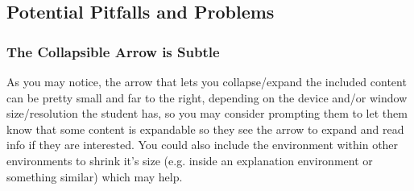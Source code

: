 \documentclass{ximera}
\begin{document}
    \subsection*{Potential Pitfalls and Problems}
    
        \subsubsection*{The Collapsible Arrow is Subtle}
            As you may notice, the arrow that lets you collapse/expand the included content can be pretty small and far to the right, depending on the device and/or window size/resolution the student has, so you may consider prompting them to let them know that some content is expandable so they see the arrow to expand and read info if they are interested. You could also include the environment within other environments to shrink it's size (e.g. inside an explanation environment or something similar) which may help.
    
\end{document}
